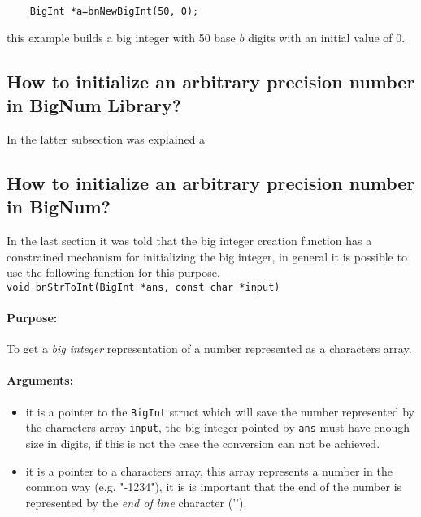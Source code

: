 \documentclass{book}
\begin{document}
\begin{verbatim}
    BigInt *a=bnNewBigInt(50, 0);
\end{verbatim}

this example builds a big integer with 50 base $b$ digits with an initial value of 0.

\subsection{How to initialize an arbitrary precision number in BigNum Library?}

In the latter subsection was explained a 

\subsection{How to initialize an arbitrary precision number in BigNum?}

In the last section it was told that the big integer creation function has a constrained mechanism for initializing the big integer, in general it is possible to use the following function for this purpose.\\

\verb+void bnStrToInt(BigInt *ans, const char *input)+\\

\paragraph{Purpose:} 

To get a \emph{big integer} representation of a number represented as a characters array.

\paragraph{Arguments:}

\begin{itemize}
\item

 it is a pointer to the \verb+BigInt+ struct which will save the number represented by the characters array \verb+input+, the big integer pointed by \verb+ans+ must have enough size in digits, if this is not the case the conversion can not be achieved.

\item 

 it is a pointer to a characters array, this array represents a number in the common way (e.g. "-1234"), it is is important that the end of the number is represented by the \emph{end of line} character ('\0').  

\end{itemize}
\end{document}
